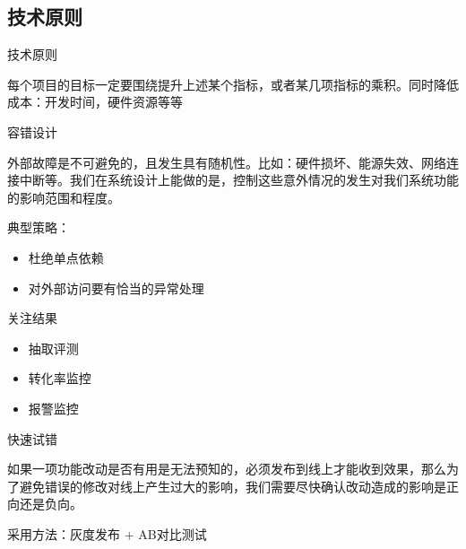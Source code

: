 \documentclass{beamer}
\begin{document}
\begin{CJK}{UTF8}{gbsn}
\section{技术原则}

\begin{frame}{技术原则}

每个项目的目标一定要围绕提升上述某个指标，或者某几项指标的乘积。同时降低成本：开发时间，硬件资源等等


\end{frame}

\begin{frame}{容错设计}

外部故障是不可避免的，且发生具有随机性。比如：硬件损坏、能源失效、网络连接中断等。我们在系统设计上能做的是，控制这些意外情况的发生对我们系统功能的影响范围和程度。

典型策略：

\begin{itemize}
  \item { 杜绝单点依赖 }
  \item { 对外部访问要有恰当的异常处理 }
\end{itemize}

\end{frame}


\begin{frame}{关注结果}

\begin{itemize}
  \item { 抽取评测 }
  \item { 转化率监控 }
  \item { 报警监控 }
\end{itemize}

\end{frame}

\begin{frame}{快速试错}

如果一项功能改动是否有用是无法预知的，必须发布到线上才能收到效果，那么为了避免错误的修改对线上产生过大的影响，我们需要尽快确认改动造成的影响是正向还是负向。

采用方法：灰度发布 + AB对比测试

\end{frame}


\end{CJK}
\end{document}
